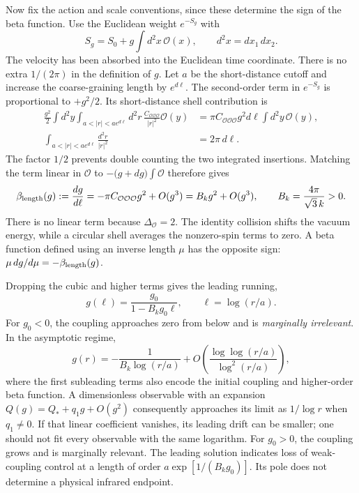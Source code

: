 \begin{example}
Now fix the action and scale conventions, since these determine
the sign of the beta function. Use the Euclidean weight
$e^{-S_g}$ with
\[
 S_g=S_0+g\int d^2x\,\mathcal O(x),\qquad
 d^2x=dx_1\,dx_2.
\]
The velocity has been absorbed into the Euclidean time coordinate.
There is no extra $1/(2\pi)$ in the definition of $g$.
Let $a$ be the short-distance cutoff and increase the coarse-graining
length by $e^{d\ell}$. The second-order term in $e^{-S_g}$ is
proportional to $+g^2/2$. Its short-distance shell contribution is
\begin{align*}
 \frac{g^2}{2}\int d^2y
       \int_{a<|r|<ae^{d\ell}}d^2r\,
       \frac{C_{\mathcal O\mathcal O\mathcal O}}{|r|^2}
                         \mathcal O(y)
 &=
 \pi C_{\mathcal O\mathcal O\mathcal O}g^2d\ell
                         \int d^2y\,\mathcal O(y),\\
 \int_{a<|r|<ae^{d\ell}}\frac{d^2r}{|r|^2}
 &=2\pi\,d\ell.
\end{align*}
The factor $1/2$ prevents double counting the two integrated
insertions. Matching the term linear in $\mathcal O$ to
$-\bigl(g+dg\bigr)\int\mathcal O$ therefore gives
\begin{equation}
 \beta_{\rm length}(g):=\frac{dg}{d\ell}
 =-\pi C_{\mathcal O\mathcal O\mathcal O}g^2+O(g^3)
 =B_k g^2+O(g^3),
 \qquad B_k=\frac{4\pi}{\sqrt3\,k}>0.
 \label{eq:full-isotropic-beta}
\end{equation}
There is no linear term because $\Delta_{\mathcal O}=2$.
The identity collision shifts the vacuum energy, while a circular
shell averages the nonzero-spin terms to zero. A beta function
defined using an inverse length $\mu$ has the opposite sign:
$\mu\,dg/d\mu=-\beta_{\rm length}(g)$.

Dropping the cubic and higher terms gives the leading running,
\[
 g(\ell)=\frac{g_0}{1-B_k g_0\ell},
 \qquad \ell=\log(r/a).
\]
For $g_0<0$, the coupling approaches zero from below and is
\emph{marginally irrelevant}. In the asymptotic regime,
\[
 g(r)=-\frac1{B_k\log(r/a)}
       +O\!\left(\frac{\log\log(r/a)}{\log^2(r/a)}\right),
\]
where the first subleading terms also encode the initial coupling
and higher-order beta function. A dimensionless observable with
an expansion $Q(g)=Q_*+q_1g+O(g^2)$ consequently approaches its
limit as $1/\log r$ when $q_1\ne0$. If that linear coefficient
vanishes, its leading drift can be smaller; one should not fit
every observable with the same logarithm.
For $g_0>0$, the coupling grows and is marginally relevant.
The leading solution indicates loss of weak-coupling control at
a length of order $a\exp[1/(B_k g_0)]$. Its pole does not determine
a physical infrared endpoint.


\end{example}
